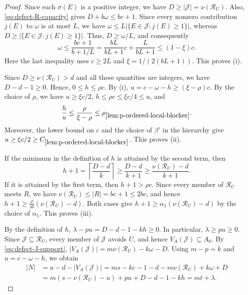 \documentclass[10pt,a4paper]{article}
\numberwithin{equation}{section}
\theoremstyle{definition}
\newcommand{\Rcal}{\mathcal R}
\begin{document}
\begin{proof}
        Since each $\sigma(E)$ is a positive integer, we have
        $D\ge|\mathcal J|=\nu(\Rcal_U)$.
        Also, \eqref{eq:defect-R-capacity} gives
        $D+b\omega\le bc+1$.
        Since every nonzero contribution $j(E)$ to $\omega$ is at most
        $L$, we have
        $\omega\le L|\{E\in\mathcal J:j(E)\ge1\}|$, whereas
        $D\ge|\{E\in\mathcal J:j(E)\ge1\}|$.
        Thus, $D\ge\omega/L$, and consequently
        \[
                \omega
                \le\frac{bc+1}{b+1/L}
                =\frac{bL}{bL+1}c+\frac{L}{bL+1}
                \le(1-\xi)c.
        \]
        Here the last inequality uses $c\ge2L$ and
        $\xi=1/(2(bL+1))$.
        This proves (i).

        Since $D\ge\nu(\Rcal_U)>d$ and all these quantities are
        integers, we have $D-d-1\ge0$.
        Hence, $0\le h\le\rho c$.
        By (i), $u=c-\omega-h\ge(\xi-\rho)c$.
        By the choice of $\rho$, we have
        $u\ge\xi c/2$,
        $h\le\rho c\le\xi c/4\le u$, and
        \[
                \frac hu
                \le\frac{\rho}{\xi-\rho}
                \le\rho_{\ref{lem:p-ordered-local-blocker}}.
        \]
        Moreover, the lower bound on $c$ and the choice of $\beta'$ in
        the hierarchy give
        $u\ge\xi c/2\ge
                C_{\ref{lem:p-ordered-local-blocker}}$.
        This proves (ii).

        If the minimum in the definition of $h$ is attained by the second term, then
        \[
                h+1
                =
                \left\lceil\frac{D-d}{k}\right\rceil
                \ge\frac{D-d}{k+1}
                \ge\frac{\nu(\Rcal_U)-d}{k+1}.
        \]
        If it is attained by the first term, then $h+1>\rho c$.
        Since every member of $\Rcal_U$ meets $R$, we have
        $\nu(\Rcal_U)\le|R|=bc+1\le2bc$, and hence
        $h+1\ge\frac{\rho}{4b}(\nu(\Rcal_U)-d)$.
        Both cases give
        $h+1\ge\alpha_1(\nu(\Rcal_U)-d)$ by the choice of $\alpha_1$.
        This proves (iii).

        By the definition of $h$,
        $\lambda-pu=D-d-1-kh\ge0$.
        In particular, $\lambda\ge pu\ge0$.
        Since $\mathcal J\subseteq\Rcal_U$, every member of
        $\mathcal J$ avoids $U$, and hence
        $V_A(\mathcal J)\subseteq A_0$.
        By \eqref{eq:defect-J-support},
        $|V_A(\mathcal J)|=m\nu(\Rcal_U)-k\omega-D$.
        Using $m-p=k$ and $u=c-\omega-h$, we obtain
        \[
                \begin{aligned}
                        |N|
                         & =
                        a-d-|V_A(\mathcal J)|=
                        ms-kc-1-d-m\nu(\Rcal_U)+k\omega+D \\
                         & =m(s-\nu(\Rcal_U)-u)
                        +pu+D-d-1-kh=mt+\lambda.
                \end{aligned}
        \]


\end{proof}
\end{document}

